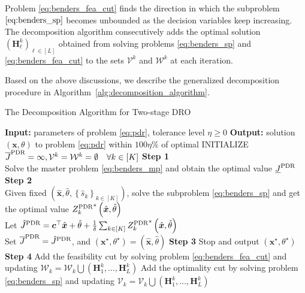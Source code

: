 \documentclass{article}
\begin{document}
\noindent Problem \eqref{eq:benders_fea_cut} finds the direction in which the subproblem $\eqref{eq:benders_sp}$ becomes unbounded as the decision variables keep increasing. The decomposition algorithm consecutively adds the optimal solution $(\bm H_\ell^k)_{\ell \in [L]}$ obtained from solving problems \eqref{eq:benders_sp} and \eqref{eq:benders_fea_cut} to the sets $\mathcal{V}^k$ and $\mathcal{W}^k$ at each iteration. %

Based on the above discussions, we describe the generalized decomposition procedure in Algorithm~\ref{alg:decomposition_algorithm}.
\begin{algorithm}[h] 
 \caption{The Decomposition Algorithm for Two-stage DRO}
 \begin{algorithmic}[1]  
 \label{alg:decomposition_algorithm}
 \STATE \textbf{Input:} parameters of problem \eqref{eq:pdr}, tolerance level $\eta \geq 0$
 \STATE \textbf{Output:} solution $(\bm x, \theta)$ to problem \eqref{eq:pdr} within $100\eta\%$ of optimal
 \STATE INITIALIZE $\overline{J}^{\textup{PDR}} = \infty, \mathcal{V}^k = \mathcal{W}^k = \emptyset \quad \forall k \in [K]$
    \STATE \textbf{Step 1} \\
     Solve the master problem \eqref{eq:benders_mp} and obtain the optimal value $\underline{J}^{\textup{PDR}}$ \\
    \STATE \textbf{Step 2} \\
    \STATE Given fixed $(\hat{\bm x}, \hat{\theta}, \left \{ \hat{s}_k \right \}_{k \in [K]})$, solve the subproblem \eqref{eq:benders_sp} and get the optimal value ${Z^{\textup{PDR}}_k}^* \left(\hat{\bm x}, \hat{\theta} \right)$
    \ENDFOR \\
    Let $\hat{J}^{\textup{PDR}} = \bm c^\top \hat{\bm x} + \hat{\theta} + \frac{1}{\delta} \sum_{k\in[K]} {Z^{\textup{PDR}}_k}^* \left(\hat{\bm x}, \hat{\theta} \right)$ \\
        \STATE Set $\overline{J}^{\textup{PDR}} = \hat{J}^{\textup{PDR}}$, and $\left ( \bm x^\star, \theta^\star \right) = \left(\hat{\bm x}, \hat{\theta} \right)$
        \ENDIF
    \STATE \textbf{Step 3} 
    \STATE Stop and output $\left ( \bm x^\star, \theta^\star \right )$
    \ENDIF
    \STATE \textbf{Step 4}
    \STATE Add the feasibility cut by solving problem \eqref{eq:benders_fea_cut} and updating $\mathcal{W}_k = \mathcal{W}_k \bigcup ( \bm H_1^k, \dots, \bm H_L^k )$
    \STATE Add the optimality cut by solving problem \eqref{eq:benders_sp} and updating $\mathcal{V}_k = \mathcal{V}_k \bigcup ( \bm H_1^k, \dots, \bm H_L^k )$
    \ENDIF
    \ENDFOR
 \ENDWHILE
 \end{algorithmic}
 \end{algorithm}
\end{document}
